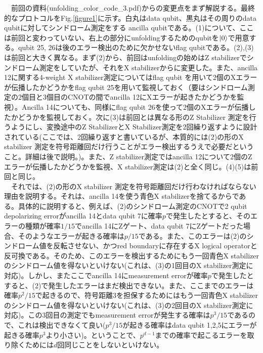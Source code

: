 \documentclass[a4paper,10pt]{ltjsarticle}
\begin{document}
{    　前回の資料(unfolding\_color\_code\_3.pdf)からの変更点をまず解説する。最終的なプロトコルをFig.\ref{figure1}に示す。白丸はdata qubit、黒丸はその周りのdata qubitに対してシンドローム測定をする ancilla qubitである。(1)について、ここは前回と変わっていない、右上の部分にunfoldingするためのqubitを$\ket{0}$で用意する。qubit 25, 26は後のエラー検出のために欠かせないflag qubitである。(2),(3)は前回と大きく異なる。まず(2)から、前回はunfoldingの始めはZ stabilizerでシンドローム測定をしていたが、それをX stabilizerからに変更した。また、ancilla 12に関する4-weight X stabilizer測定についてはflag qubit を用いて2個のXエラーが伝播したかどうかをflag qubit 25を用いて監視しておく（要はシンドローム測定の2個目と3個目のCNOTの間でancilla 12にXエラーが起きたかどうかを監視）。Ancilla 14についても、同様にflag qubit 26を使って2個のXエラーが伝播したかどうかを監視しておく。次に(3)は前回とは異なる形のZ Stabilizer 測定を行うようにし、変換途中のZ StabilizerとX Stabilizer測定を2回繰り返すように設計されている(ここでは、2回繰り返すと書いているが、本質的には(2)の形のX stabilizer 測定を符号距離回だけ行うことがエラー検出するうえで必要だということ。詳細は後で説明。)。また、Z stabilizer測定ではancilla 12について2個のZエラーが伝播したかどうかを監視、X stabilizer測定は(2)と全く同じ。(4)(5)は前回と同じ。\\
    　それでは、(2)の形のX stabilizer 測定を符号距離回だけ行わなければならない理由を説明する。それは、ancilla 14を使う青色X stabilizerを捨てるからである。具体的に説明すると、例えば、(2)のシンドローム測定のCNOTで2 qubit depolarizing errorがancilla 14とdata qubit 7に確率$p$で発生したとすると、そのエラーの種類が確率$1/15$でancilla 14にZゲート、data qubit 7にZゲートだった場合、そのようなエラーが起きる確率は$p/15$である。また、このエラーは(2)のシンドローム値を反転させない、かつred boundaryに存在するX logical operatorと反可換である。そのため、このエラーを検出するためにもう一回青色X stabilizerのシンドローム値を得ないといけない(これは、(3)の1回目のX stabilizer測定に対応)。しかし、またここでancilla 14にmeasurement errorが確率$p$で発生したとすると、(2)で発生したエラーはまだ検出できない。また、ここまでのエラーは確率$p^2/15$で起きるので、符号距離3を担保するためにはもう一回青色X stabilizerのシンドローム値を得ないといけない(これは、(3)の2回目のX stabilizer測定に対応)。この3回目の測定でもmeasurement errorが発生する確率は$p^3/15$であるので、これは検出できなくて良い($p^3/15$が起きる確率はdata qubit 1,2,5にエラーが起きる確率$p^3$より小さい)。ということで、$p^{d-1}$までの確率で起こるエラーを取り除くためには$d$回同じことをしないといけない。\\
}
\end{document}
